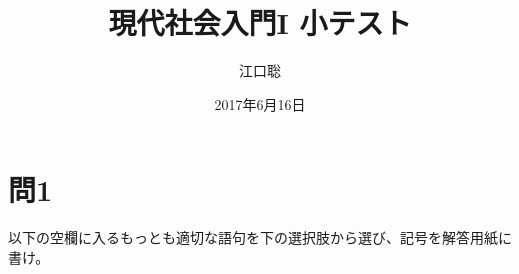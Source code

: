 \documentclass[uplatex,dvipdfmx]{jsarticle}
\author{江口聡}
\date{2017年6月16日}
\title{現代社会入門I 小テスト}
\begin{document}
\maketitle

\setcounter{qnumber}{1}
\def\anaume{\hspace{.5zw}\framebox[1.5cm]{\bf \theqnumber}\hspace{.5zw}\stepcounter{qnumber}}

\setcounter{anumber}{1}
\newcommand\sentakusi[1]{{{{\bf \alph{anumber}}~#1}\hspace{1zw}} \stepcounter{anumber}}


\section*{問1}

以下の空欄に入るもっとも適切な語句を下の選択肢から選び、記号を解答用紙に書け。
\end{document}
